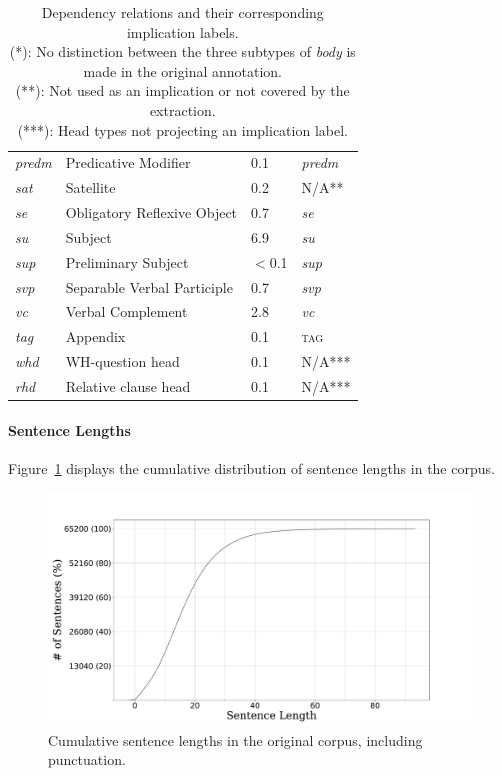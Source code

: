 \begin{table}
\begin{tabularx}{1\linewidth}{ussU}
      \textit{predm} & Predicative Modifier &0.1& \textit{predm}\\      
      \textit{sat} & Satellite &0.2& N/A**\\
      \textit{se} & Obligatory Reflexive Object &0.7& \textit{se}\\      
      \textit{su} & Subject &6.9& \textit{su}\\
      \textit{sup} & Preliminary Subject &$<$0.1& \textit{sup}\\
      \textit{svp} & Separable Verbal Participle &0.7& \textit{svp}\\   
      \textit{vc} & Verbal Complement &2.8& \textit{vc}\\
      \textit{tag} & Appendix &0.1& \textsc{tag}\\
      \textit{whd} & WH-question head &0.1&N/A***\\
      \textit{rhd} & Relative clause head &0.1& N/A***\\
\end{tabularx}
\caption[Extracted Dependency Labels]{Dependency relations and their corresponding implication labels.\\
(*): No distinction between the three subtypes of \textit{body} is made in the original annotation.\\
(**): Not used as an implication or not covered by the extraction.\\
(***): Head types not projecting an implication label.}\label{table:colors}
\end{table}

\paragraph{Sentence Lengths}
Figure~\ref{fig:lassy_sentence_lens} displays the cumulative distribution of sentence lengths in the corpus.

\begin{figure}
    \centering
    \includegraphics[scale=0.29]{Figures/len.pdf}
    \caption[Lassy-Small Sentence Lengths]{Cumulative sentence lengths in the original corpus, including punctuation.}
    \label{fig:lassy_sentence_lens}
\end{figure}

